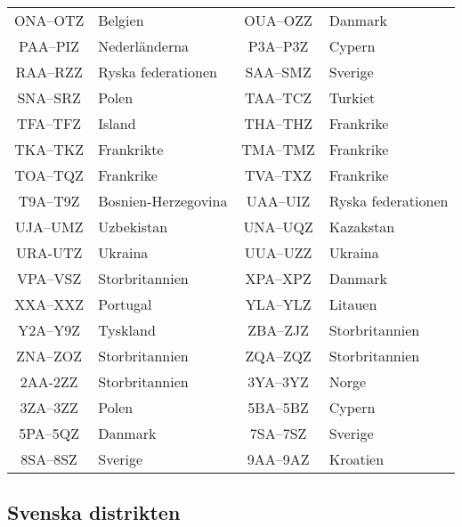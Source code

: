 \begin{center}
\begin{longtable}{cl|cl}
	      ONA--OTZ        & Belgien              &    OUA--OZZ     & Danmark               \\
	      PAA--PIZ        & Nederländerna        &    P3A--P3Z     & Cypern                \\
	      RAA--RZZ        & Ryska federationen   &    SAA--SMZ     & Sverige               \\
	      SNA--SRZ        & Polen                &    TAA--TCZ     & Turkiet               \\
	      TFA--TFZ        & Island               &    THA--THZ     & Frankrike             \\
	      TKA--TKZ        & Frankrikte           &    TMA--TMZ     & Frankrike             \\
	      TOA--TQZ        & Frankrike            &    TVA--TXZ     & Frankrike             \\
	      T9A--T9Z        & Bosnien-Herzegovina  &    UAA--UIZ     & Ryska federationen    \\
	      UJA--UMZ        & Uzbekistan           &    UNA--UQZ     & Kazakstan             \\
	       URA-UTZ        & Ukraina              &    UUA--UZZ     & Ukraina               \\
	      VPA--VSZ        & Storbritannien       &    XPA--XPZ     & Danmark               \\
	      XXA--XXZ        & Portugal             &    YLA--YLZ     & Litauen               \\
	      Y2A--Y9Z        & Tyskland             &    ZBA--ZJZ     & Storbritannien        \\
	      ZNA--ZOZ        & Storbritannien       &    ZQA--ZQZ     & Storbritannien        \\
	       2AA-2ZZ        & Storbritannien       &    3YA--3YZ     & Norge                 \\
	      3ZA--3ZZ        & Polen                &    5BA--5BZ     & Cypern                \\
	      5PA--5QZ        & Danmark              &    7SA--7SZ     & Sverige               \\
	      8SA--8SZ        & Sverige              &    9AA--9AZ     & Kroatien
\end{longtable}
\end{center}

\subsection{Svenska distrikten}

